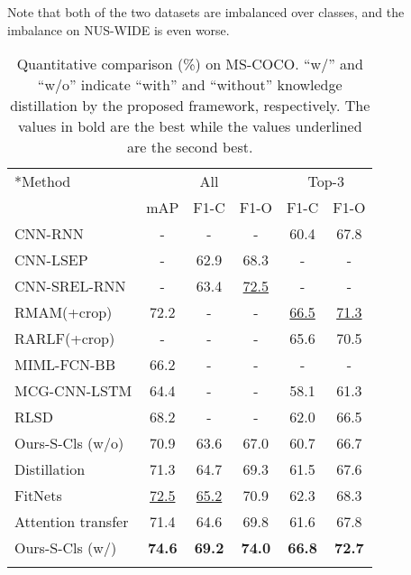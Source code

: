 \documentclass[sigconf,natbib=false]{acmart}
\begin{document}
Note that both of the two datasets are imbalanced over classes, and the imbalance on NUS-WIDE is even worse.
\begin{table}[t]
  \centering
\small
  \caption{\small Quantitative comparison (\%) on MS-COCO. ``w/'' and ``w/o'' indicate ``with'' and ``without'' knowledge distillation by the proposed framework, respectively. The values in bold are the best while the values underlined are the second best.}
  \vspace{-5pt}
  \label{tab:coco}
  \begin{tabular}{l|ccc|cc}
  \Xhline{1.2pt}
  \multirow{2}*{Method}&\multicolumn{3}{c|}{All}&\multicolumn{2}{c}{Top-3} \\
  \cline{2-6}
  &mAP&F1-C&F1-O&F1-C&F1-O \\
  \Xhline{1.2pt}
  CNN-RNN \cite{MLIC6_cvpr16_JYJZCW}&-&-&-&60.4&67.8 \\
  CNN-LSEP \cite{MLIC2_cvpr17_YYJ} &-&62.9&68.3&-&- \\
  CNN-SREL-RNN \cite{MLIC3_cvpr17_FTTWC}&-&63.4&\underline{72.5}&-&- \\
  RMAM(+crop) \cite{MLIC7_iccv17_ZTGRL}&72.2&-&-&\underline{66.5}&\underline{71.3} \\
  RARLF(+crop) \cite{MLIC17_aaai18_TZGL}&-&-&-&65.6&70.5 \\
  MIML-FCN-BB \cite{MLIC11_cvpr17_hjjy}&66.2&-&-&-&- \\
  MCG-CNN-LSTM \cite{MLIC22_tmm18_jqjcj}&64.4&-&-&58.1&61.3 \\
  RLSD \cite{MLIC22_tmm18_jqjcj}&68.2&-&-&62.0&66.5 \\
 \hline
  Ours-S-Cls (w/o)&70.9&63.6&67.0&60.7&66.7 \\
Distillation \cite{KD1_nips15_goj}&71.3&64.7&69.3&61.5&67.6 \\
  FitNets \cite{KD2_iclr15_ansacy}&\underline{72.5}&\underline{65.2}&70.9&62.3&68.3 \\
  Attention transfer \cite{KD3_iclr17_sn}&71.4&64.6&69.8&61.6&67.8 \\
  \hline
  Ours-S-Cls (w/)&\textbf{74.6}&\textbf{69.2}&\textbf{74.0}&\textbf{66.8}&\textbf{72.7} \\
  \Xhline{1.2pt}
  \end{tabular}
\end{table}
\end{document}

